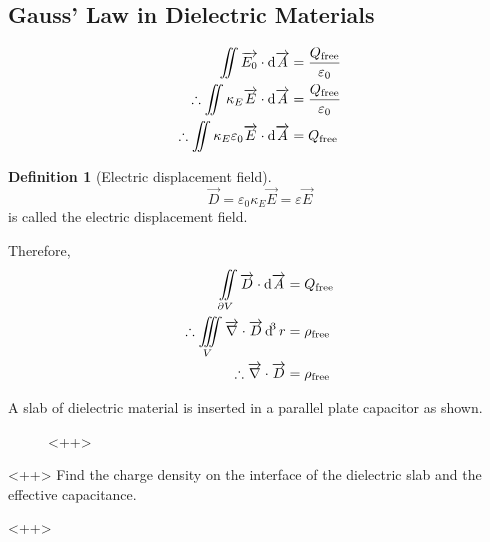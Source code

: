 \documentclass[fleqn, a4paper, 12pt, twoside]{article}
\theoremstyle{definition}
\newtheorem{definition}{Definition}
\theoremstyle{theorem}
\begin{document}
\subsection{Gauss' Law in Dielectric Materials}

\begin{align*}
	\iint \overrightarrow{E_0} \cdot \dif \overrightarrow{A}                                 & = \dfrac{Q_{\textnormal{free}}}{\varepsilon_0} \\
	\therefore \iint \kappa_E \overrightarrow{E} \cdot \dif \overrightarrow{A}               & = \dfrac{Q_{\textnormal{free}}}{\varepsilon_0} \\
	\therefore \iint \kappa_E \varepsilon_0 \overrightarrow{E} \cdot \dif \overrightarrow{A} & = Q_{\textnormal{free}}
\end{align*}

\begin{definition}[Electric displacement field]
	\begin{equation*}
		\overrightarrow{D} = \varepsilon_0 \kappa_E \overrightarrow{E} = \varepsilon \overrightarrow{E}
	\end{equation*}
	is called the electric displacement field.
\end{definition}

Therefore,
\begin{align*}
	\iint\limits_{\partial V} \overrightarrow{D} \cdot \dif \overrightarrow{A}             & = Q_{\textnormal{free}}    \\
	\therefore \iiint\limits_{V} \overrightarrow{\nabla} \cdot \overrightarrow{D} \dif^3 r & = \rho_{\textnormal{free}} \\
	\therefore \overrightarrow{\nabla} \cdot \overrightarrow{D}                            & = \rho_{\textnormal{free}}
\end{align*}

\begin{question}
	A slab of dielectric material is inserted in a parallel plate capacitor as shown.
	\begin{figure}[H]
		<++>
	\end{figure}<++>
	Find the charge density on the interface of the dielectric slab and the effective capacitance.
\end{question}<++>
\end{document}
